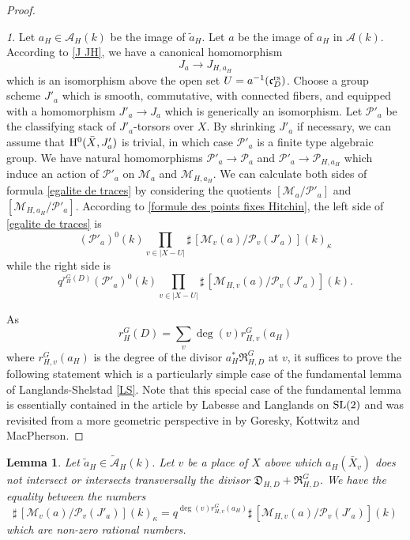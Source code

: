 \documentclass[12pt,english]{smfart}
\numberwithin{equation}{subsection}
\newtheorem{lemme}[equation]{Lemma}
\theoremstyle{remark}
\newtheorem{numero}[equation]{}
\newcommand\calA{{\mathscr A}}
\newcommand\calP{{\mathscr P}}
\newcommand\calM{{\mathscr M}}
\newcommand\frakc{{\mathfrak c}}
\newcommand\rmH{{\rm H}}
\newcommand\SL{{\rm SL}}
\newcommand\rs{{\rm rs}}
\newcommand\resultant{\mathfrak R}
\newcommand\discrim{\mathfrak D}
\begin{document}
\begin{proof}
\begin{numero}
Let $a_H\in \calA_H(k)$ be the image of $\tilde a_H$. Let $a$ be the image of $a_H$
in $\calA(k)$. According to \ref{J JH}, we have a canonical homomorphism
$$J_a\rightarrow J_{H,a_H}$$
which is an isomorphism above the open set $U=a^{-1}(\frakc_D^\rs)$.
Choose a group scheme $J'_a$ which is smooth, commutative, with connected
fibers, and equipped with a homomorphism $J'_a\rightarrow J_a$ which is
generically an isomorphism. Let $\calP'_a$ be the classifying stack of
$J'_a$-torsors over $X$. By shrinking $J'_a$ if necessary, we can
assume that $\rmH^0(\bar X,J'_a)$ is trivial, in which case $\calP'_a$ is a
finite type algebraic group. We have natural homomorphisms
$\calP'_a \rightarrow \calP_a$ and $\calP'_a \rightarrow \calP_{H,a_H}$ which
induce an action of $\calP'_a$ on $\calM_a$ and $\calM_{H,a_H}$. We can
calculate both sides of formula \ref{egalite de traces} by
considering the quotients $[\calM_a/\calP'_a]$ and
$[\calM_{H,a_H}/\calP'_a]$. According to \ref{formule des points fixes Hitchin},
the left side of \ref{egalite de traces} is
$$(\calP'_a)^0(k) \prod_{v\in |X-U|} \sharp\,
[\calM_v(a)/\calP_v(J'_a)](k)_\kappa
$$
while the right side is
$$q^{r_H^G(D)}(\calP'_a)^0(k) \prod_{v\in |X-U|} \sharp\,
[\calM_{H,v}(a)/\calP_v(J'_a)](k).
$$
\end{numero}


As
$$r_H^G(D)=\sum_v \deg(v) r_{H,v}^G(a_H)$$
where $r_{H,v}^G(a_H)$ is the degree of the divisor $a_H^*
\resultant_{H,D}^G$ at $v$, it suffices to prove the following statement which
is a particularly simple case of the fundamental lemma of
Langlands-Shelstad \ref{LS}. Note that this special case of the fundamental
lemma is essentially contained in the article \cite{LL} by Labesse
and Langlands on $\SL(2)$ and was revisited from a more geometric perspective in \cite{GKM} by
Goresky, Kottwitz and MacPherson.
\end{proof}

\begin{lemme}\label{LF simple}
Let $\tilde a_H \in \tilde\calA_H(k)$. Let $v$ be a place of $X$ above
which $a_H(\bar X_v)$ does not intersect or intersects transversally the divisor
$\discrim_{H,D}+\resultant_{H,D}^G$. We have the equality between the
numbers
$$\sharp\,[\calM_v(a)/\calP_v(J'_a)](k)_\kappa=
q^{\deg(v)r_{H,v}^G(a_H) } \sharp\,[\calM_{H,v}(a)/\calP_v(J'_a)](k)
$$
which are non-zero rational numbers.
\end{lemme}
\end{document}
